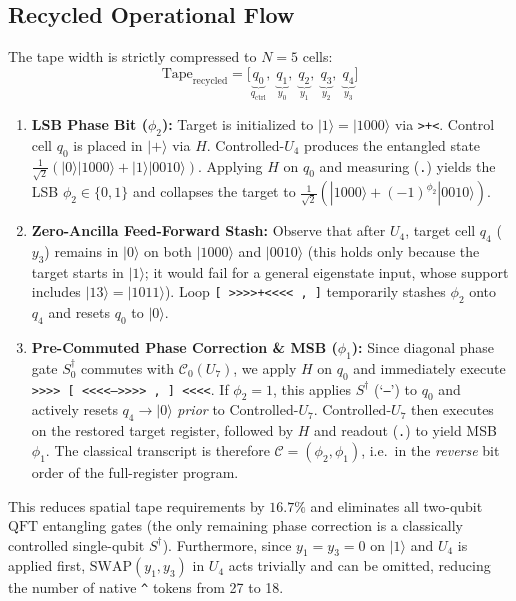 \documentclass[11pt,a4paper,twocolumn]{article}
\newcommand{\ket}[1]{| #1 \rangle}
\begin{document}
\subsection{Recycled Operational Flow}
The tape width is strictly compressed to $N = 5$ cells:
\begin{equation}
    \text{Tape}_{\text{recycled}} = \Big[ \underbrace{q_0}_{q_{\text{ctrl}}}, \; \underbrace{q_1}_{y_0}, \; \underbrace{q_2}_{y_1}, \; \underbrace{q_3}_{y_2}, \; \underbrace{q_4}_{y_3} \Big]
\end{equation}
\begin{enumerate}
    \item \textbf{LSB Phase Bit ($\phi_2$):} Target is initialized to $\ket{1} = \ket{1000}$ via \texttt{>+<}. Control cell $q_0$ is placed in $\ket{+}$ via $H$. Controlled-$U_4$ produces the entangled state $\frac{1}{\sqrt{2}}(\ket{0}\ket{1000} + \ket{1}\ket{0010})$. Applying $H$ on $q_0$ and measuring (\texttt{.}) yields the LSB $\phi_2 \in \{0, 1\}$ and collapses the target to $\frac{1}{\sqrt{2}}(\ket{1000} + (-1)^{\phi_2}\ket{0010})$.
    \item \textbf{Zero-Ancilla Feed-Forward Stash:} Observe that after $U_4$, target cell $q_4$ ($y_3$) remains in $\ket{0}$ on both $\ket{1000}$ and $\ket{0010}$ (this holds only because the target starts in $\ket{1}$; it would fail for a general eigenstate input, whose support includes $\ket{13} = \ket{1011}$). Loop \texttt{[ >>>>+<<<< , ]} temporarily stashes $\phi_2$ onto $q_4$ and resets $q_0$ to $\ket{0}$.
    \item \textbf{Pre-Commuted Phase Correction \& MSB ($\phi_1$):} Since diagonal phase gate $S^\dagger_0$ commutes with $\mathcal{C}_0(U_7)$, we apply $H$ on $q_0$ and immediately execute \texttt{>>>> [ <<<<-->>>> , ] <<<<}. If $\phi_2 = 1$, this applies $S^\dagger$ (`\texttt{--}') to $q_0$ and actively resets $q_4 \to \ket{0}$ \emph{prior} to Controlled-$U_7$. Controlled-$U_7$ then executes on the restored target register, followed by $H$ and readout (\texttt{.}) to yield MSB $\phi_1$. The classical transcript is therefore $\mathcal{C} = (\phi_2, \phi_1)$, i.e.\ in the \emph{reverse} bit order of the full-register program.
\end{enumerate}
This reduces spatial tape requirements by $16.7\%$ and eliminates all two-qubit $\text{QFT}$ entangling gates (the only remaining phase correction is a classically controlled single-qubit $S^\dagger$). Furthermore, since $y_1 = y_3 = 0$ on $\ket{1}$ and $U_4$ is applied first, $\text{SWAP}(y_1, y_3)$ in $U_4$ acts trivially and can be omitted, reducing the number of native \texttt{\^{}} tokens from 27 to 18.
\end{document}

